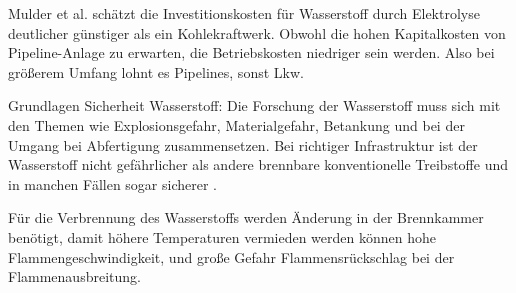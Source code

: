 %
Mulder et al. \cite{mulder2019outlook} schätzt die Investitionskosten für Wasserstoff durch Elektrolyse deutlicher günstiger als ein Kohlekraftwerk. 
Obwohl die hohen Kapitalkosten von Pipeline-Anlage zu erwarten, die Betriebskosten niedriger sein werden. Also bei größerem Umfang lohnt es Pipelines, sonst Lkw.


Grundlagen Sicherheit Wasserstoff:
Die Forschung der Wasserstoff muss sich mit den Themen wie Explosionsgefahr, Materialgefahr, 
Betankung und bei der Umgang bei Abfertigung zusammensetzen. 
Bei richtiger Infrastruktur ist der Wasserstoff nicht gefährlicher als andere brennbare konventionelle Treibstoffe und in manchen 
Fällen sogar sicherer \cite{khandelwal2013hydrogen}.

Für die Verbrennung des Wasserstoffs werden Änderung in der Brennkammer benötigt, damit höhere Temperaturen vermieden werden können \cite{khandelwal2013hydrogen}
hohe Flammengeschwindigkeit, und große Gefahr Flammensrückschlag bei der Flammenausbreitung.
